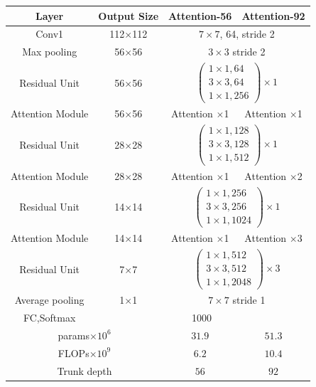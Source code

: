 \documentclass[10pt,twocolumn,letterpaper]{article}
\begin{document}
\begin{table}\small
\setlength{\abovecaptionskip}{0pt}
\setlength{\belowcaptionskip}{-10pt}
\footnotesize
\begin{center}
\begin{tabular}{c|c|c|c} \hline

Layer &Output Size &Attention-56&Attention-92 \\
\hline
Conv1 & 112$\times$112 & \multicolumn{2}{|c}{$7\times 7$, 64, stride 2}  \\
\hline
Max pooling & 56$\times$56& \multicolumn{2}{|c}{$3\times 3$ stride 2}  \\
\hline
Residual Unit& 56$\times$56 & \multicolumn{2}{|c}{
$\left(
	\begin{matrix}
	1\times 1, 64 \\
	3\times 3, 64 \\
	1\times	1, 256
	\end{matrix}
\right)\times 1$
}  \\
\hline
Attention Module& 56$\times$56 & Attention $\times$1 & Attention $\times$1  \\
\hline
Residual Unit& 28$\times$28 & \multicolumn{2}{|c}{
$\left(
	\begin{matrix}
	1\times 1, 128 \\
	3\times 3, 128 \\
	1\times	1, 512
	\end{matrix}
\right)\times 1$
}  \\
\hline
Attention Module& 28$\times$28 & Attention $\times$1 & Attention $\times$2  \\
\hline
Residual Unit& 14$\times$14 & \multicolumn{2}{|c}{
$\left(
	\begin{matrix}
	1\times 1, 256 \\
	3\times 3, 256 \\
	1\times	1, 1024
	\end{matrix}
\right)\times 1$
}  \\
\hline
Attention Module& 14$\times$14 & Attention $\times$1 & Attention $\times$3  \\
\hline
Residual Unit& 7$\times$7 & \multicolumn{2}{|c}{
$\left(
	\begin{matrix}
	1\times 1, 512 \\
	3\times 3, 512 \\
	1\times	1, 2048
	\end{matrix}
\right)\times 3$
}  \\
\hline
Average pooling & 1$\times$1& \multicolumn{2}{|c}{$7\times 7$ stride 1}  \\
\hline
FC,Softmax & \multicolumn{3}{|c}{1000}  \\
\hline
\multicolumn{2}{c|}{params$\times 10^6$} & $31.9$ & $51.3$  \\
\hline
\multicolumn{2}{c|}{FLOPs$\times 10^9$} & $6.2$ &$10.4$  \\
\hline
\multicolumn{2}{c|}{Trunk depth} & $56 $ & $92$  \\
\hline


\end{tabular}
\end{center}
\end{table}
\end{document}

